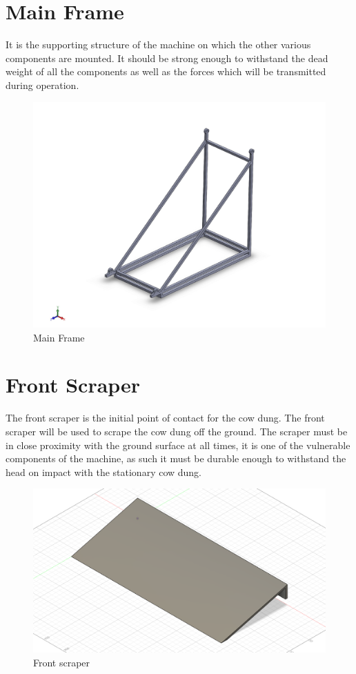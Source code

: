 \section{Main Frame} \label{Main Frame}
It is the supporting structure of the machine on which the other various components are mounted. It should be strong enough to withstand the dead weight of all the components as well as the forces which will be transmitted during operation.
\begin{figure}[h!]
\center
\includegraphics[scale=0.4]{MainFrame}
\caption{Main Frame}
\end{figure}


\section{Front Scraper} \label{Front Scraper}
The front scraper is the initial point of contact for the cow dung. The front scraper will be used to scrape the cow dung off the ground. The scraper must be in close proximity with the ground surface at all times, it is one of the vulnerable components of the machine, as such it must be durable enough to withstand the head on impact with the stationary cow dung.
\begin{figure}[h!]
\center
\includegraphics[scale=0.2]{Frontscraper}
\caption{Front scraper}
\end{figure}


